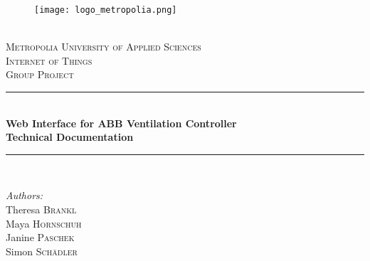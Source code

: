 \newcommand{\HRule}{\rule{\linewidth}{0.5mm}} %
\thispagestyle{empty}
\begin{center} %
 

\begin{figure}
	\setlength{\belowcaptionskip}{50pt}
	\begin{center}
   		\texttt{[image: logo\_metropolia.png]}
	\end{center}
\end{figure}


\phantom{This text will be invisible}\\[1cm]
\textsc{\Large Metropolia University of Applied Sciences}\\[1.25cm] %
\textsc{\Large Internet of Things}\\[1.0cm] %
\textsc{\Large Group Project}\\[1.5cm] %

\HRule \\[0.2cm]
\large{ \bfseries Web Interface for ABB Ventilation Controller\\
Technical Documentation
 }\\[0.02cm] %
\HRule \\[1.5cm]
 

\begin{minipage}{0.5\linewidth}
\begin{flushleft}\normalsize
\emph{Authors:}\\
Theresa \textsc{Brankl} %
\\
Maya \textsc{Hornschuh} %
\\
Janine  \textsc{Paschek} %
\\
Simon \textsc{Schädler} %
\end{flushleft}
\end{minipage}


\end{center}
